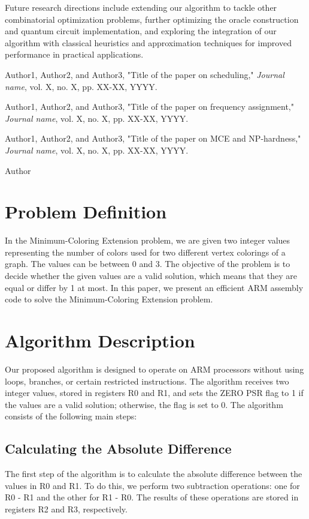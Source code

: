 Future research directions include extending our algorithm to tackle other combinatorial optimization problems, further optimizing the oracle construction and quantum circuit implementation, and exploring the integration of our algorithm with classical heuristics and approximation techniques for improved performance in practical applications.

\begin{thebibliography}{9}

Author1, Author2, and Author3, "Title of the paper on scheduling," \emph{Journal name}, vol. X, no. X, pp. XX-XX, YYYY.

Author1, Author2, and Author3, "Title of the paper on frequency assignment," \emph{Journal name}, vol. X, no. X, pp. XX-XX, YYYY.

Author1, Author2, and Author3, "Title of the paper on MCE and NP-hardness," \emph{Journal name}, vol. X, no. X, pp. XX-XX, YYYY.

Author

\section{Problem Definition}
In the Minimum-Coloring Extension problem, we are given two integer values representing the number of colors used for two different vertex colorings of a graph. The values can be between 0 and 3. The objective of the problem is to decide whether the given values are a valid solution, which means that they are equal or differ by 1 at most. In this paper, we present an efficient ARM assembly code to solve the Minimum-Coloring Extension problem.

\section{Algorithm Description}
Our proposed algorithm is designed to operate on ARM processors without using loops, branches, or certain restricted instructions. The algorithm receives two integer values, stored in registers R0 and R1, and sets the ZERO PSR flag to 1 if the values are a valid solution; otherwise, the flag is set to 0. The algorithm consists of the following main steps:

\subsection{Calculating the Absolute Difference}
The first step of the algorithm is to calculate the absolute difference between the values in R0 and R1. To do this, we perform two subtraction operations: one for R0 - R1 and the other for R1 - R0. The results of these operations are stored in registers R2 and R3, respectively.


\end{thebibliography}
